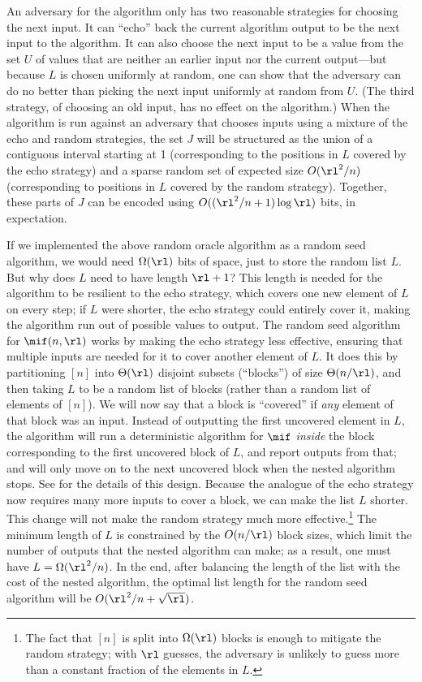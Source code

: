 \begin{itemize}
\begin{itemize}
An adversary for the algorithm only has two reasonable strategies for choosing the
next input. It can ``echo'' back the current algorithm output to be the next input to
the algorithm. It can also choose the next input to be a value from the set $U$ of
values that are neither an earlier input nor the current output---but because $L$
is chosen uniformly at random, one can show that the adversary can do no better than picking
the next input uniformly at random from $U$. (The third strategy, of choosing an old
input, has no effect on the algorithm.) When the algorithm is run against an
adversary that chooses inputs using a mixture of the echo and random strategies,
the set $J$ will be structured as the union of a contiguous interval starting at 1
(corresponding to the positions in $L$ covered by the echo strategy) and a sparse
random set of expected size $O(\rl^2/n)$ (corresponding to positions in $L$ covered by
the random strategy). Together, these parts of $J$ can be encoded using 
$O((\rl^2/n + 1) \log \rl)$ bits, in expectation.

 If we implemented the above random
oracle algorithm as a random seed algorithm, we would need $\Omega(\rl)$ bits
of space, just to store the random list $L$. But why does $L$ need to have
length $\rl + 1$?  This length is needed for the algorithm to be resilient to
the echo strategy, which covers one new element of $L$ on every step; if $L$
were shorter, the echo strategy could entirely cover it, making the algorithm
run out of possible values to output. The random seed algorithm for
$\mif(n,\rl)$ works by making the echo strategy less effective, ensuring that
multiple inputs are needed for it to cover another element of $L$. It does this
by partitioning $[n]$ into $\Theta(\rl)$ disjoint subsets (``blocks'') of size
$\Theta(n/\rl)$, and then taking $L$ to be a random list of blocks (rather
than a random list of elements of $[n]$).  We will now say that a block is
``covered'' if \emph{any} element of that block was an input. Instead of
outputting the first uncovered element in $L$, the algorithm will run a
deterministic algorithm for $\mif$ \emph{inside} the block corresponding to
the first uncovered block of $L$, and report outputs from that; and will only
move on to the next uncovered block when the nested algorithm stops. See
 for the details of this design. Because the analogue of
the echo strategy now requires many more inputs to cover a block, we can make
the list $L$ shorter. This change will not make the random strategy much more
effective.\footnote{The fact that $[n]$ is split into $\Omega(\rl)$ blocks is
enough to mitigate the random strategy; with $\rl$ guesses, the adversary is
unlikely to guess more than a constant fraction of the elements in $L$.} The
minimum length of $L$ is constrained by the $O(n/\rl)$ block sizes, which limit the number of outputs that the nested algorithm can make; as a result, one must have $L = \Omega(\rl^2/n)$. In the end, after balancing the length of the list with the
cost of the nested algorithm, the optimal list length for the random seed
algorithm will be $O(\rl^2/n + \sqrt{\rl})$.


\end{itemize}
\end{itemize}

